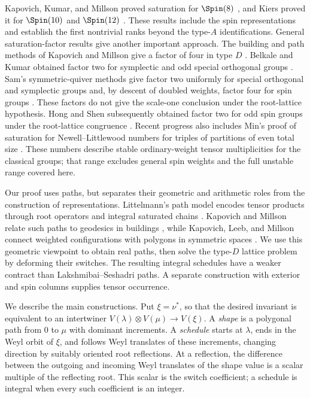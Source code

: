 Kapovich, Kumar, and Millson proved saturation
for $\Spin(8)$ \cite[Theorem~5.3]{KKM09}, and Kiers proved it for $\Spin(10)$ and
$\Spin(12)$ \cite[Theorem~1.3]{Kiers19}. These results include the
spin representations and establish the first nontrivial ranks beyond
the type-$A$ identifications. General saturation-factor results give
another important approach. The building and path methods of
Kapovich and Millson give a factor of four in type $D$
\cite[Theorem~1.1]{KM08}. Belkale and Kumar obtained factor two for
symplectic and odd special orthogonal groups \cite{BK10}. Sam's
symmetric-quiver methods give factor two uniformly for special
orthogonal and symplectic groups and, by descent of doubled weights,
factor four for spin groups
\cite[Theorem~1.1 and Corollary~1.2]{Sam12}. These factors do not give
the scale-one conclusion under the root-lattice hypothesis.
Hong and Shen subsequently obtained factor two for odd spin groups
under the root-lattice congruence \cite[Corollary~1.3]{HS15}.
Recent progress also includes Min's proof of saturation for
Newell--Littlewood numbers for triples of partitions of even total
size \cite[Theorem~1.2]{Min24}. These numbers describe stable
ordinary-weight tensor multiplicities for the classical groups;
that range excludes general spin weights and the full unstable
range covered here.

Our proof uses paths, but separates their geometric and arithmetic
roles from the construction of representations. Littelmann's path
model encodes tensor products through root operators and integral
saturated chains \cite{Lit94,Lit95}. Kapovich and Millson relate such
paths to geodesics in buildings \cite{KM08}, while Kapovich, Leeb, and
Millson connect weighted configurations with polygons in symmetric
spaces \cite{KLM09}. We use this geometric viewpoint to obtain real
paths, then solve the type-$D$ lattice problem by deforming their
switches. The resulting integral schedules have a weaker contract than
Lakshmibai--Seshadri paths. A separate construction with exterior and
spin columns supplies tensor occurrence.

We describe the main constructions. Put $\xi=\nu^*$, so that the
desired invariant is equivalent to an intertwiner
$V(\lambda)\otimes V(\mu)\longrightarrow V(\xi)$.
A \emph{shape} is a polygonal path from $0$ to $\mu$ with dominant
increments. A \emph{schedule} starts at $\lambda$, ends in the Weyl
orbit of $\xi$, and follows Weyl translates of these increments,
changing direction by suitably oriented root reflections. At a
reflection, the difference between the outgoing and incoming Weyl
translates of the shape value is a scalar multiple of the reflecting
root. This scalar is the switch coefficient; a schedule is integral
when every such coefficient is an integer.

